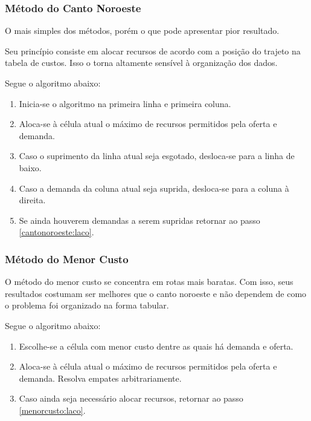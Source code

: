 \documentclass [11pt]{articleSBPO}
\begin{document}
\subsubsection{Método do Canto Noroeste}\label{subsubsec:noroeste}

O mais simples dos métodos, porém o que pode apresentar pior resultado.

Seu princípio consiste em alocar recursos de acordo com a posição do trajeto na tabela de custos. Isso o torna altamente sensível à organização dos dados.

Segue o algoritmo abaixo:

\begin{enumerate}
	\item Inicia-se o algoritmo na primeira linha e primeira coluna.
	\item Aloca-se à célula atual o máximo de recursos permitidos pela oferta e demanda. \label{cantonoroeste:laco}
	\item Caso o suprimento da linha atual seja esgotado, desloca-se para a linha de baixo.
	\item Caso a demanda da coluna atual seja suprida, desloca-se para a coluna à direita.
	\item Se ainda houverem demandas a serem supridas retornar ao passo \ref{cantonoroeste:laco}.
\end{enumerate}

\subsubsection{Método do Menor Custo}\label{subsubsec:menorcusto}

O método do menor custo se concentra em rotas mais baratas. Com isso, seus resultados costumam ser melhores que o canto noroeste e não dependem de como o problema foi organizado na forma tabular.

Segue o algoritmo abaixo:

\begin{enumerate}
	\item Escolhe-se a célula com menor custo dentre as quais há demanda e oferta. \label{menorcusto:laco}
	\item Aloca-se à célula atual o máximo de recursos permitidos pela oferta e demanda. Resolva empates arbitrariamente.
	\item Caso ainda seja necessário alocar recursos, retornar ao passo \ref{menorcusto:laco}.
\end{enumerate}
\end{document}
